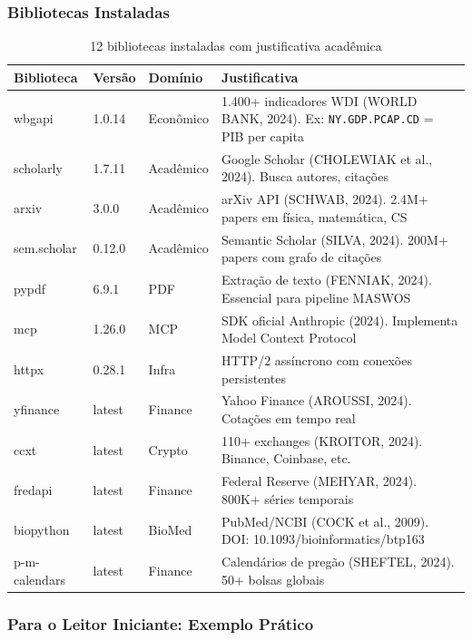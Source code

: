 \documentclass[12pt,a4paper]{article}
\begin{document}
\subsubsection{Bibliotecas Instaladas}

\begin{table}[H]
  \centering
  \caption{12 bibliotecas instaladas com justificativa acadêmica}
  \begin{tabular}{l l l p{5cm}}
    \toprule
    \textbf{Biblioteca} & \textbf{Versão} & \textbf{Domínio} & \textbf{Justificativa} \\
    \midrule
    wbgapi      & 1.0.14 & Econômico  & 1.400+ indicadores WDI (WORLD BANK, 2024). Ex: \texttt{NY.GDP.PCAP.CD} = PIB per capita \\
    scholarly   & 1.7.11 & Acadêmico  & Google Scholar (CHOLEWIAK et al., 2024). Busca autores, citações \\
    arxiv       & 3.0.0  & Acadêmico  & arXiv API (SCHWAB, 2024). 2.4M+ papers em física, matemática, CS \\
    sem.scholar & 0.12.0 & Acadêmico  & Semantic Scholar (SILVA, 2024). 200M+ papers com grafo de citações \\
    pypdf       & 6.9.1  & PDF        & Extração de texto (FENNIAK, 2024). Essencial para pipeline MASWOS \\
    mcp         & 1.26.0 & MCP        & SDK oficial Anthropic (2024). Implementa Model Context Protocol \\
    httpx       & 0.28.1 & Infra      & HTTP/2 assíncrono com conexões persistentes \\
    yfinance    & latest & Finance    & Yahoo Finance (AROUSSI, 2024). Cotações em tempo real \\
    ccxt        & latest & Crypto     & 110+ exchanges (KROITOR, 2024). Binance, Coinbase, etc. \\
    fredapi     & latest & Finance    & Federal Reserve (MEHYAR, 2024). 800K+ séries temporais \\
    biopython   & latest & BioMed     & PubMed/NCBI (COCK et al., 2009). DOI: 10.1093/bioinformatics/btp163 \\
    p-m-calendars & latest & Finance  & Calendários de pregão (SHEFTEL, 2024). 50+ bolsas globais \\
    \bottomrule
  \end{tabular}
\end{table}

\subsubsection{Para o Leitor Iniciante: Exemplo Prático}
\end{document}
